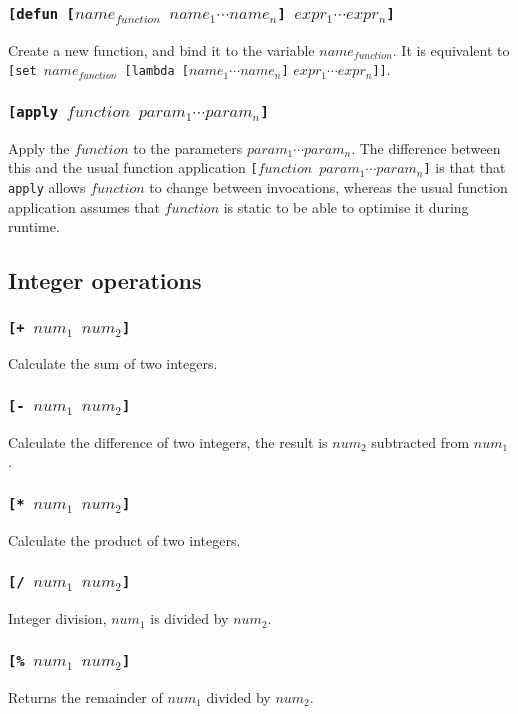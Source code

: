 \subsubsection{\tt{[defun [}$name_{function}$ $name_1 \cdots name_n$\tt{]} $expr_1 \cdots expr_n$\tt{]}}
Create a new function, and bind it to the variable $name_{function}$. It is equivalent to {\tt{[set }}$name_{function}${\tt{ [lambda [}}$name_1 \cdots name_n${\tt{]}} $expr_1 \cdots expr_n${\tt{]]}}.

\subsubsection{\tt{[apply }$function$ $param_1 \cdots param_n$\tt{]}}
Apply the $function$ to the parameters $param_1\cdots param_n$. The difference between this and the usual function application {\tt{[}$function$ $param_1\cdots param_n$\tt{]}} is that that \verb|apply| allows $function$ to change between invocations, whereas the usual function application assumes that $function$ is static to be able to optimise it during runtime.

\subsection{Integer operations}
\subsubsection{\tt{[+ }$num_1$ $num_2$\tt{]}}
Calculate the sum of two integers.
\subsubsection{\tt{[- }$num_1$ $num_2$\tt{]}}
Calculate the difference of two integers, the result is $num_2$ subtracted from $num_1$.
\subsubsection{\tt{[* }$num_1$ $num_2$\tt{]}}
Calculate the product of two integers.
\subsubsection{\tt{[/ }$num_1$ $num_2$\tt{]}}
Integer division, $num_1$ is divided by $num_2$.
\subsubsection{\tt{[\% }$num_1$ $num_2$\tt{]}}
Returns the remainder of $num_1$ divided by $num_2$.

